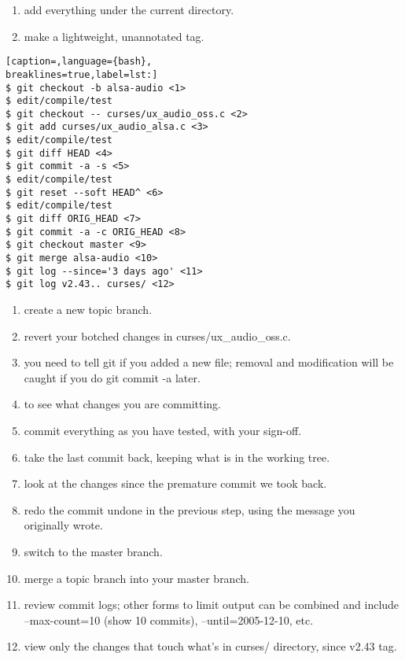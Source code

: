 \begin{enumerate}
\setlength{\itemsep}{0cm}
\setlength{\parskip}{0cm}
\item add everything under the current directory.
\item make a lightweight, unannotated tag.
\end{enumerate}

\lstset{basicstyle=\scriptsize, numbers=none, captionpos=b, tabsize=4}
\begin{lstlisting}[caption=,language={bash},
breaklines=true,label=lst:]
$ git checkout -b alsa-audio <1>
$ edit/compile/test
$ git checkout -- curses/ux_audio_oss.c <2>
$ git add curses/ux_audio_alsa.c <3>
$ edit/compile/test
$ git diff HEAD <4>
$ git commit -a -s <5>
$ edit/compile/test
$ git reset --soft HEAD^ <6>
$ edit/compile/test
$ git diff ORIG_HEAD <7>
$ git commit -a -c ORIG_HEAD <8>
$ git checkout master <9>
$ git merge alsa-audio <10>
$ git log --since='3 days ago' <11>
$ git log v2.43.. curses/ <12>
\end{lstlisting}

\begin{enumerate}
\setlength{\itemsep}{0cm}
\setlength{\parskip}{0cm}
\item create a new topic branch.
\item revert your botched changes in curses/ux\_audio\_oss.c.
\item you need to tell git if you added a new file; removal and modification
will be caught if you do git commit -a later.
\item to see what changes you are committing.
\item commit everything as you have tested, with your sign-off.
\item take the last commit back, keeping what is in the working tree.
\item look at the changes since the premature commit we took back.
\item redo the commit undone in the previous step, using the message you
originally wrote.
\item switch to the master branch.
\item merge a topic branch into your master branch.
\item review commit logs; other forms to limit output can be combined and
include --max-count=10 (show 10 commits), --until=2005-12-10, etc.
\item view only the changes that touch what’s in curses/ directory, since v2.43
tag.
\end{enumerate}

